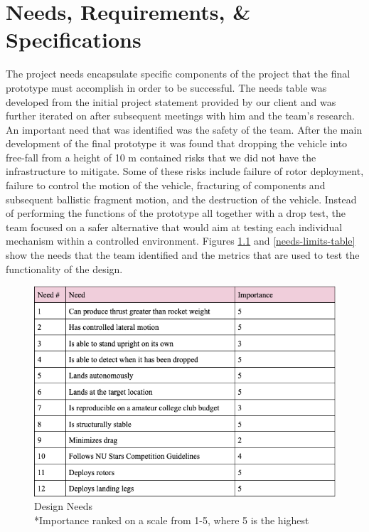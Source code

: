 \chapter{Needs, Requirements, \& Specifications}
\label{needs-and-specs}
The project needs encapsulate specific components of the project that the final prototype must accomplish in order to be successful. The needs table was developed from the initial project statement provided by our client and was further iterated on after subsequent meetings with him and the team’s research. 
An important need that was identified was the safety of the team. After the main development of the final prototype it was found that dropping the vehicle into free-fall from a height of 10 m contained risks that we did not have the infrastructure to mitigate. Some of these risks include failure of rotor deployment, failure to control the motion of the vehicle, fracturing of components and subsequent ballistic fragment motion, and the destruction of the vehicle. Instead of performing the functions of the prototype all together with a drop test, the team focused on a safer alternative that would aim at testing each individual mechanism within a controlled environment. Figures \ref{needs-table} and \ref{needs-limits-table} show the needs that the team identified and the metrics that are used to test the functionality of the design.

\begin{figure}
    \centering
    \includegraphics[width=1.0\textwidth]{src/figs/needstable.png}
    \caption{Design Needs \\ *Importance ranked on a scale from 1-5, where 5 is the highest}
    \label{needs-table}
\end{figure}


